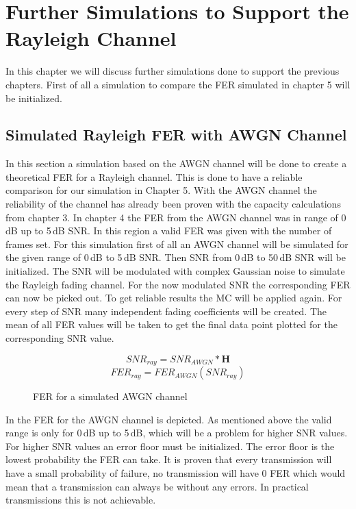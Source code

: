 \chapter{Further Simulations to Support the Rayleigh Channel} \label{chap:Experiments}
\graphicspath{{C:/Users/Kevin/Bachelarbeit/Bachelorarbeit/01_Bachelorarbeit_LaTex/02_Figures/}}

In this chapter we will discuss further simulations done to support the previous chapters. First of all a simulation to compare the \gls{FER} simulated in chapter 5 will be initialized.
\section{Simulated Rayleigh FER with AWGN Channel}
\label{RAYAWGN}

In this section a simulation based on the AWGN channel will be done to create a theoretical \gls{FER} for a Rayleigh channel. This is done to have a reliable comparison for our simulation in Chapter 5. 
With the AWGN channel the reliability of the channel has already been proven with the capacity calculations from chapter 3. In chapter 4 the \gls{FER} from the AWGN channel was in range of 0\,dB up to 5\,dB SNR. In this region a valid \gls{FER} was given with the number of frames set. 
For this simulation first of all an AWGN channel will be simulated for the given range of 0\,dB to 5\,dB SNR. Then SNR from 0\,dB to 50\,dB SNR will be initialized. The SNR will be modulated with complex Gaussian noise to simulate the Rayleigh fading channel. For the now modulated SNR the corresponding \gls{FER} can now be picked out. To get reliable results the \gls{MC} will be applied again. For every step of SNR many independent fading coefficients will be created. The mean of all \gls{FER} values will be taken to get the final data point plotted for the corresponding \gls{SNR} value.    

\begin{equation}
SNR_{ray} = SNR_{AWGN} * \textbf{H}
\end{equation}
\begin{equation}
FER_{ray} = FER_{AWGN}(SNR_{ray})
\end{equation}

\begin{figure}[!htb]
	\setlength{}
	\setlength\fheight{0.4\textheight}
    \centering
    
    \caption{FER for a simulated AWGN channel}
    \label{fig:FERAWGN}
\end{figure}
In  the \gls{FER} for the AWGN channel is depicted. As mentioned above the valid range is only for 0\,dB up to 5\,dB, which will be a problem for higher \gls{SNR} values. For higher SNR values an error floor must be initialized. The error floor is the lowest probability the \gls{FER} can take. It is proven that every transmission will have a small probability of failure, no transmission will have 0 \gls{FER} which would mean that a transmission can always be without any errors. In practical transmissions this is not achievable.

